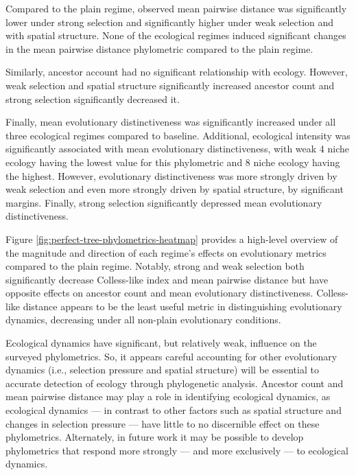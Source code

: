 Compared to the plain regime, observed mean pairwise distance was significantly lower under strong selection and significantly higher under weak selection and with spatial structure.
None of the ecological regimes induced significant changes in the mean pairwise distance phylometric compared to the plain regime.

Similarly, ancestor account had no significant relationship with ecology.
However, weak selection and spatial structure significantly increased ancestor count and strong selection significantly decreased it.

Finally, mean evolutionary distinctiveness was significantly increased under all three ecological regimes compared to baseline.
Additional, ecological intensity was significantly associated with mean evolutionary distinctiveness, with weak 4 niche ecology having the lowest value for this phylometric and 8 niche ecology having the highest.
However, evolutionary distinctiveness was more strongly driven by weak selection and even more strongly driven by spatial structure, by significant margins.
Finally, strong selection significantly depressed mean evolutionary distinctiveness.



Figure \ref{fig:perfect-tree-phylometrics-heatmap} provides a high-level overview of the magnitude and direction of each regime's effects on evolutionary metrics compared to the plain regime.
Notably, strong and weak selection both significantly decrease Colless-like index and mean pairwise distance but have opposite effects on ancestor count and mean evolutionary distinctiveness.
Colless-like distance appears to be the least useful metric in distinguishing evolutionary dynamics, decreasing under all non-plain evolutionary conditions.

Ecological dynamics have significant, but relatively weak, influence on the surveyed phylometrics.
So, it appears careful accounting for other evolutionary dynamics (i.e., selection pressure and spatial structure) will be essential to accurate detection of ecology through phylogenetic analysis.
Ancestor count and mean pairwise distance may play a role in identifying ecological dynamics, as ecological dynamics --- in contrast to other factors such as spatial structure and changes in selection pressure --- have little to no discernible effect on these phylometrics.
Alternately, in future work it may be possible to develop phylometrics that respond more strongly --- and more exclusively --- to ecological dynamics.

